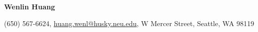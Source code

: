 \documentclass[letterpaper,11pt]{article}
\begin{document}

    \centering\textbf{\huge Wenlin Huang}\\ \vspace{0.1in}

    (650) 567-6624,
    \href {mailto:huang.wenl@husky.neu.edu} {huang.wenl@husky.neu.edu},
    {W Mercer Street, Seattle, WA 98119} \\
\end{document}
